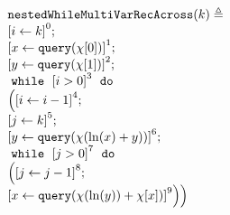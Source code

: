   \begin{figure}
    \centering
    {\footnotesize
    \begin{subfigure}{.4\textwidth}
    \begin{centering}
    $ 
    \begin{array}{l}
      \kw{nestedWhileMultiVarRecAcross}(k) \triangleq \\
      \clabel{\assign{i}{k} }^{0} ; \\
      \clabel{ \assign{x}{\query(\chi[0])}}^{1} ; \\
      \clabel{ \assign{y}{\query(\chi[1])}}^{2} ; \\
          \ewhile ~ \clabel{i > 0}^{3} ~ \edo ~ \\
          \Big(
           \clabel{\assign{i}{i-1}}^{4} ;\\
           \clabel{\assign{j}{k}}^{5} ;\\
           \clabel{\assign{y}{\query(\chi(\ln(x) + y))} }^{6}  ; \\
           \ewhile ~ \clabel{j > 0}^{7} ~ \edo ~ \\
           \Big(
            \clabel{\assign{j}{j-1}}^{8};\\
            \clabel{\assign{x}{\query(\chi(\ln(y))+\chi[x])} }^{9}
            \Big) \Big)
      \end{array}
    $
    \caption{}
    \end{centering}
    \end{subfigure}
    \quad
    \begin{subfigure}{.52\textwidth}
      \begin{centering}
\end{centering}
\end{subfigure}}
\end{figure}
